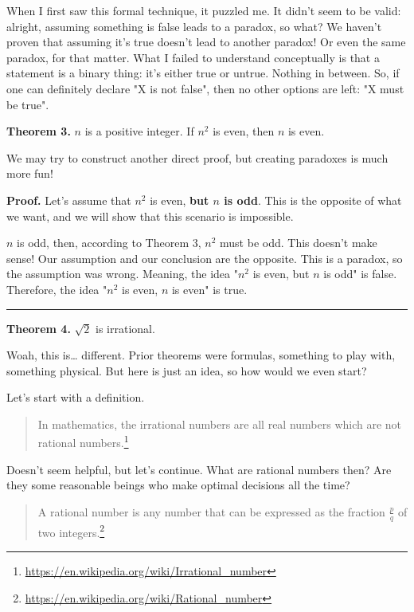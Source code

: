 \documentclass[12pt, a4paper, justified, notitlepage, sfsidenotes, notoc]{book}
\begin{document}
When I first saw this formal technique, it puzzled me. It didn't seem to be valid: alright, assuming something is false leads to a paradox, so what? We haven't proven that assuming it's true doesn't lead to another paradox! Or even the same paradox, for that matter. What I failed to understand conceptually is that a statement is a binary thing: it's either true or untrue. Nothing in between. So, if one can definitely declare "X is not false", then no other options are left: "X must be true".

\textbf{Theorem 3.} \(n\) is a positive integer. If \(n^2\) is even, then \(n\) is even.

We may try to construct another direct proof, but creating paradoxes is much more fun!

\textbf{Proof.} Let's assume that \(n^2\) is even, \textbf{but \(n\) is odd}. This is the opposite of what we want, and we will show that this scenario is impossible.

\(n\) is odd, then, according to Theorem 3, \(n^2\) must be odd. This doesn't make sense! Our assumption and our conclusion are the opposite. This is a paradox, so the assumption was wrong. Meaning, the idea "\(n^2\) is even, but \(n\) is odd" is false. Therefore, the idea "\(n^2\) is even, \(n\) is even" is true.

\noindent\rule{\textwidth}{0.5pt}

\textbf{Theorem 4.} \(\sqrt{2}\) is irrational.

Woah, this is\ldots{} different. Prior theorems were formulas, something to play with, something physical. But here is just an idea, so how would we even start?

Let's start with a definition.

\begin{quote}
In mathematics, the irrational numbers are all real numbers which are not rational numbers.\footnote{\url{https://en.wikipedia.org/wiki/Irrational\_number}}
\end{quote}

Doesn't seem helpful, but let's continue. What are rational numbers then? Are they some reasonable beings who make optimal decisions all the time?

\begin{quote}
A rational number is any number that can be expressed as the fraction \(\frac{p}{q}\) of two integers.\footnote{\url{https://en.wikipedia.org/wiki/Rational\_number}}
\end{quote}
\end{document}
